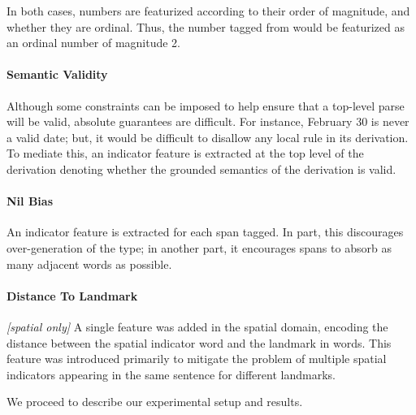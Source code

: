 In both cases, numbers are featurized according to their order of magnitude,
  and whether they are ordinal.
Thus, the number tagged from  would be featurized as an
  ordinal number of magnitude 2.

\paragraph{Semantic Validity}
Although some constraints can be imposed to help ensure that a top-level parse
  will be valid, absolute guarantees are difficult.
For instance, February 30 is never a valid date; but, it would be difficult
  to disallow any local rule in its derivation.
To mediate this, an indicator feature is extracted at the top level of the
  derivation denoting whether the grounded semantics of the derivation is
  valid.

\paragraph{Nil Bias}
An indicator feature is extracted for each  span tagged.
In part, this discourages over-generation of the type; in another part,
  it encourages  spans to absorb as many adjacent words as possible.

\paragraph{Distance To Landmark} \textit{[spatial only]}
A single feature was added in the spatial domain, encoding the distance between
  the spatial indicator word and the landmark in words.
This feature was introduced primarily to mitigate the problem of multiple
  spatial indicators appearing in the same sentence for different landmarks.


We proceed to describe our experimental setup and results.
